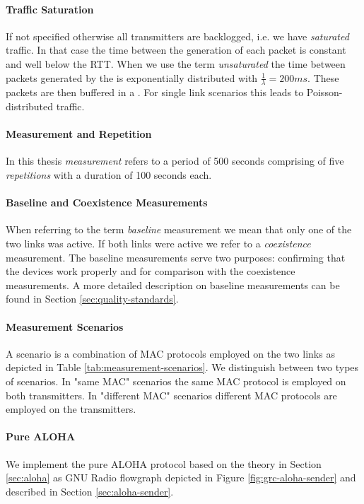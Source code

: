 \paragraph{Traffic Saturation}
If not specified otherwise all transmitters are backlogged, i.e. we have \emph{saturated} traffic. In that case the time between the generation of each packet is constant and well below the RTT. When we use the term \emph{unsaturated} the time between packets generated by the  is exponentially distributed with $\frac{1}{\lambda}=200ms$. These packets are then buffered in a . For single link scenarios this leads to Poisson-distributed traffic.

\paragraph{Measurement and Repetition}
In this thesis \emph{measurement} refers to a period of 500 seconds comprising of five \emph{repetitions} with a duration of 100 seconds each. 

\paragraph{Baseline and Coexistence Measurements}
When referring to the term \emph{baseline} measurement we mean that only one of the two links was active. If both links were active we refer to a \emph{coexistence} measurement. The baseline measurements serve two purposes: confirming that the devices work properly and for comparison with the coexistence measurements. A more detailed description on baseline measurements can be found in Section \ref{sec:quality-standards}.   

\paragraph{Measurement Scenarios}
A scenario is a combination of  MAC protocols employed on the two links as depicted in Table \ref{tab:measurement-scenarios}. We distinguish between two types of scenarios. In "same MAC" scenarios the same MAC protocol is employed on both transmitters. In "different MAC" scenarios different MAC protocols are employed on the transmitters.

\paragraph{Pure ALOHA}
We implement the pure ALOHA protocol based on the theory in Section \ref{sec:aloha} as GNU Radio flowgraph depicted in Figure \ref{fig:grc-aloha-sender} and described in Section \ref{sec:aloha-sender}.

